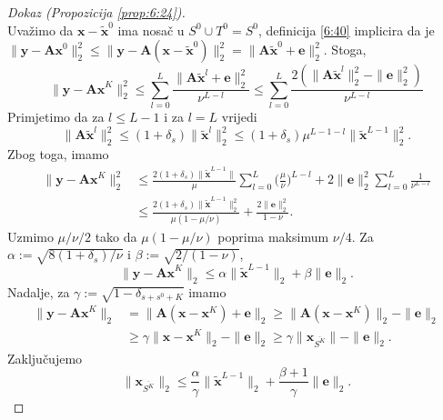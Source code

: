 \documentclass[a4paper,twoside,12pt]{memoir} %
\newcommand{\vect}[1]{\mathbf{#1}}
\renewcommand{\vec}{\vect}
\newcommand{\norm}[1]{\|{#1}\|}
\begin{document}
\begin{proof}[Dokaz (Propozicija \ref{prop:6:24})]
\begin{equation*}
    \end{equation*}
    \noindent
    Uva\v{z}imo da $\vec x - \tilde{\vec x}^0$ ima nosa\v{c} u $S^0 \cup T^0 = S^0$, definicija \eqref{6:40} implicira da je $\norm{\vec y - \vec {Ax}^0}_2^2 \leq \norm{\vec y - \vec A(\vec x - \tilde{\vec x}^0)}_2^2 = \norm{\vec A \tilde{\vec x}^0 + \vec e}_2^2$. Stoga,
    \begin{equation*}
        \norm{\vec y - \vec {Ax}^K}_2^2 \leq \sum_{l=0}^L \frac{\norm{\vec A \tilde{\vec x}^l + \vec e}_2^2}{\nu^{L-l}} \leq \sum_{l=0}^L \frac{2(\norm{\vec A \tilde{\vec x}^l}_2^2 - \norm{\vec e}_2^2)}{\nu^{L-l}}  
    \end{equation*}
    Primjetimo da za $l \leq L - 1$ i za $l = L$ vrijedi
    \begin{equation*}
        \norm{\vec A \tilde{\vec x}^l}_2^2 \leq (1+\delta_s)\norm{\tilde{\vec x}^l}_2^2 \leq (1+\delta_s)\mu^{L-1-l} \norm{\tilde{\vec x}^{L-1}}_2^2.
    \end{equation*}
    Zbog toga, imamo
    \begin{align*}
        \norm{\vec y - \vec{Ax}^K}_2^2 & \leq \frac{2(1+\delta_s)\norm{\tilde{\vec x}^{L-1}}}{\mu}\sum_{l=0}^L \bigg( \frac{\mu}{\nu} \bigg)^{L-l}+2 \norm{\vec e}_2^2 \sum_{l=0}^L \frac{1}{\nu^{L-l}}\\
        &\leq \frac{2(1+\delta_s)\norm{\tilde{\vec x}^{L-1}}_2^2}{\mu(1-\mu/\nu)}+ \frac{2\norm{\vec e}_2^2}{1-\nu}. 
    \end{align*}
    Uzmimo $\mu/\nu/2$ tako da $\mu(1-\mu/\nu)$ poprima maksimum $\nu/4$. Za $\alpha := \sqrt{8(1+\delta_s)/\nu}$ i $\beta := \sqrt{2/(1-\nu)}$,
    \begin{equation}\label{6:44}
        \norm{\vec y - \vec{Ax}^K}_2 \leq \alpha \norm{\tilde{\vec x}^{L-1}}_2 + \beta \norm{\vec e}_2.
    \end{equation}
    Nadalje, za $\gamma := \sqrt{1 - \delta_{s + s^0 + K}}$ imamo
    \begin{align*}
    \norm{\vec y - \vec{Ax}^K}_2 &= \norm{\vec A(\vec x - \vec x^K) + \vec e}_2 \geq \norm{\vec A(\vec x - \vec x^K)}_2 - \norm{\vec e}_2\\[0.5em]
        & \geq \gamma \norm{\vec x -  \vec x^K}_2 - \norm{\vec e}_2 \geq \gamma \norm{\vec x_{\overline{S^K}}} - \norm{\vec e}_2.
    \end{align*}
    Zaklju\v{c}ujemo
    \begin{equation}\label{6:45}
        \norm{\vec x_{\overline{S^K}}}_2 \leq \frac{\alpha}{\gamma} \norm{\tilde{\vec x}^{L-1}}_2 + \frac{\beta + 1}{\gamma} \norm{\vec e}_2.   

\end{equation}
\end{proof}
\end{document}
